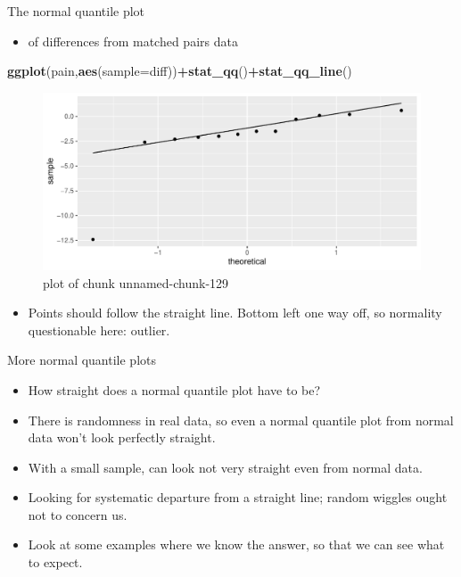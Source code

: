 \documentclass[ignorenonframetext,]{beamer}
\newenvironment{Shaded}{\begin{snugshade}}{\end{snugshade}}
\newcommand{\DataTypeTok}[1]{\textcolor[rgb]{0.13,0.29,0.53}{#1}}
\newcommand{\KeywordTok}[1]{\textcolor[rgb]{0.13,0.29,0.53}{\textbf{#1}}}
\newcommand{\NormalTok}[1]{#1}
\newcommand{\OperatorTok}[1]{\textcolor[rgb]{0.81,0.36,0.00}{\textbf{#1}}}
\providecommand{\tightlist}{%
  \setlength{\itemsep}{0pt}\setlength{\parskip}{0pt}}
\begin{document}
\begin{frame}[fragile]{The normal quantile plot}
\protect\hypertarget{the-normal-quantile-plot}{}

\begin{itemize}
\tightlist
\item
  of differences from matched pairs data
\end{itemize}

\begin{Shaded}
\begin{Highlighting}[]
\KeywordTok{ggplot}\NormalTok{(pain,}\KeywordTok{aes}\NormalTok{(}\DataTypeTok{sample=}\NormalTok{diff))}\OperatorTok{+}\KeywordTok{stat_qq}\NormalTok{()}\OperatorTok{+}\KeywordTok{stat_qq_line}\NormalTok{()}
\end{Highlighting}
\end{Shaded}

\begin{figure}
\centering
\includegraphics{figure/unnamed-chunk-129-1.pdf}
\caption{plot of chunk unnamed-chunk-129}
\end{figure}

\begin{itemize}
\tightlist
\item
  Points should follow the straight line. Bottom left one way off, so
  normality questionable here: outlier.
\end{itemize}

\end{frame}

\begin{frame}{More normal quantile plots}
\protect\hypertarget{more-normal-quantile-plots}{}

\begin{itemize}
\tightlist
\item
  How straight does a normal quantile plot have to be?
\item
  There is randomness in real data, so even a normal quantile plot from
  normal data won't look perfectly straight.
\item
  With a small sample, can look not very straight even from normal data.
\item
  Looking for systematic departure from a straight line; random wiggles
  ought not to concern us.
\item
  Look at some examples where we know the answer, so that we can see
  what to expect.
\end{itemize}

\end{frame}
\end{document}
